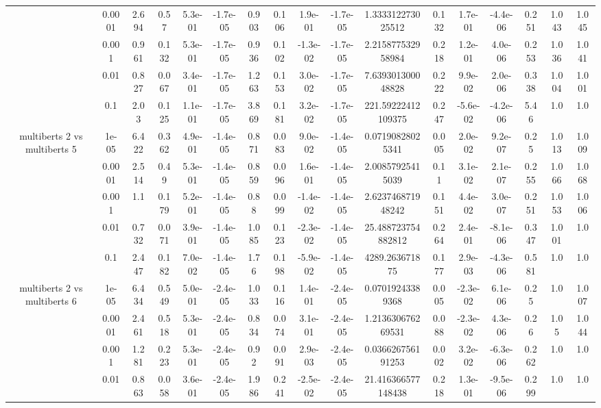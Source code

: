 \begin{tabular}{|c|c|c|c|c|c|c|c|c|c|c|c|c|c|c|c|c|}
 & 0.0001 & 2.694 & 0.57 & 5.3e-01 & -1.7e-05 & 0.903 & 0.106 & 1.9e-01 & -1.7e-05 & 1.333312273025512 & 0.132 & 1.7e-01 & -4.4e-06 & 0.251 & 1.043 & 1.045 \\
 & 0.001 & 0.961 & 0.132 & 5.3e-01 & -1.7e-05 & 0.936 & 0.102 & -1.3e-02 & -1.7e-05 & 2.215877532958984 & 0.218 & 1.2e-01 & 4.0e-06 & 0.253 & 1.036 & 1.041 \\
 & 0.01 & 0.827 & 0.067 & 3.4e-01 & -1.7e-05 & 1.263 & 0.153 & 3.0e-02 & -1.7e-05 & 7.639301300048828 & 0.222 & 9.9e-02 & 2.0e-06 & 0.338 & 1.004 & 1.001 \\
 & 0.1 & 2.03 & 0.125 & 1.1e-01 & -1.7e-05 & 3.869 & 0.181 & 3.2e-02 & -1.7e-05 & 221.59222412109375 & 0.247 & -5.6e-02 & -4.2e-06 & 5.46 & 1.0 & 1.0 \\
\hline
\multirow{5}{*}{multiberts 2 vs multiberts 5} & 1e-05 & 6.422 & 0.362 & 4.9e-01 & -1.4e-05 & 0.871 & 0.083 & 9.0e-02 & -1.4e-05 & 0.07190828025341 & 0.005 & 2.0e-02 & 9.2e-07 & 0.25 & 1.013 & 1.009 \\
 & 0.0001 & 2.514 & 0.49 & 5.3e-01 & -1.4e-05 & 0.859 & 0.096 & 1.6e-01 & -1.4e-05 & 2.00857925415039 & 0.11 & 3.1e-02 & 2.1e-07 & 0.255 & 1.066 & 1.068 \\
 & 0.001 & 1.1 & 0.179 & 5.2e-01 & -1.4e-05 & 0.88 & 0.099 & -1.4e-02 & -1.4e-05 & 2.623746871948242 & 0.151 & 4.4e-02 & 3.0e-07 & 0.251 & 1.053 & 1.006 \\
 & 0.01 & 0.732 & 0.071 & 3.9e-01 & -1.4e-05 & 1.085 & 0.123 & -2.3e-02 & -1.4e-05 & 25.488723754882812 & 0.264 & 2.4e-01 & -8.1e-06 & 0.347 & 1.001 & 1.0 \\
 & 0.1 & 2.447 & 0.182 & 7.0e-02 & -1.4e-05 & 1.76 & 0.198 & -5.9e-02 & -1.4e-05 & 4289.263671875 & 0.177 & 2.9e-03 & -4.3e-06 & 0.581 & 1.0 & 1.0 \\
\hline
\multirow{5}{*}{multiberts 2 vs multiberts 6} & 1e-05 & 6.434 & 0.549 & 5.0e-01 & -2.4e-05 & 1.033 & 0.116 & 1.4e-01 & -2.4e-05 & 0.07019243389368 & 0.005 & -2.3e-02 & 6.1e-06 & 0.25 & 1.0 & 1.007 \\
 & 0.0001 & 2.461 & 0.518 & 5.3e-01 & -2.4e-05 & 0.834 & 0.074 & 3.1e-01 & -2.4e-05 & 1.213630676269531 & 0.088 & -2.3e-02 & 4.3e-06 & 0.26 & 1.05 & 1.044 \\
 & 0.001 & 1.281 & 0.223 & 5.3e-01 & -2.4e-05 & 0.92 & 0.091 & 2.9e-03 & -2.4e-05 & 0.036626756191253 & 0.002 & 3.2e-02 & -6.3e-06 & 0.262 & 1.0 & 1.0 \\
 & 0.01 & 0.863 & 0.058 & 3.6e-01 & -2.4e-05 & 1.986 & 0.241 & -2.5e-02 & -2.4e-05 & 21.416366577148438 & 0.218 & 1.3e-01 & -9.5e-06 & 0.299 & 1.0 & 1.0 \\

\end{tabular}
